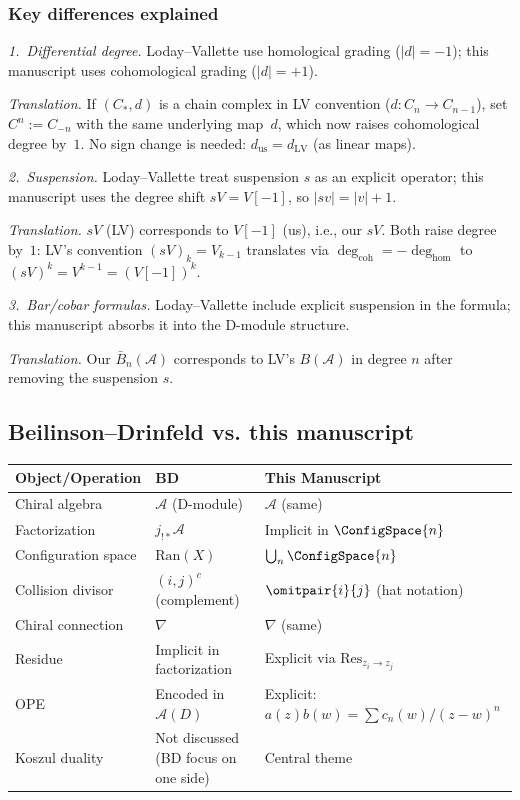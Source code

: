 \subsubsection{Key differences explained}

\emph{1.~Differential degree.}
Loday--Vallette use homological grading ($|d| = -1$); this manuscript uses cohomological grading ($|d| = +1$).

\emph{Translation.} If $(C_*, d)$ is a chain complex in LV convention ($d: C_n \to C_{n-1}$), set $C^n := C_{-n}$ with the same underlying map~$d$, which now raises cohomological degree by~$1$. No sign change is needed: $d_{\text{us}} = d_{\text{LV}}$ (as linear maps).

\emph{2.~Suspension.}
Loday--Vallette treat suspension $s$ as an explicit operator; this manuscript uses the degree shift $sV = V[-1]$, so $|sv| = |v| + 1$.

\emph{Translation.} $sV$ (LV) corresponds to $V[-1]$ (us), i.e., our $sV$. Both raise degree by~$1$: LV's convention $(sV)_k = V_{k-1}$ translates via $\deg_{\mathrm{coh}} = -\deg_{\mathrm{hom}}$ to $(sV)^k = V^{k-1} = (V[-1])^k$.

\emph{3.~Bar/cobar formulas.}
Loday--Vallette include explicit suspension in the formula; this manuscript absorbs it into the D-module structure.

\emph{Translation.} Our $\bar{B}_n(\mathcal{A})$ corresponds to LV's $B(\mathcal{A})$ in degree $n$ after removing the suspension $s$.

\subsection{Beilinson--Drinfeld vs. this manuscript}

\begin{center}
\begin{tabular}{|>{\raggedright\arraybackslash}p{5.8cm}|>{\raggedright\arraybackslash}p{3.9cm}|>{\raggedright\arraybackslash}p{3.9cm}|}
\hline
\textbf{Object/Operation} & \textbf{BD \cite{BD04}} & \textbf{This Manuscript} \\
\hline
Chiral algebra & $\mathcal{A}$ (D-module) & $\mathcal{A}$ (same) \\
Factorization & $j_{!*}\mathcal{A}$ & Implicit in $\ConfigSpace{n}$ \\
Configuration space & $\text{Ran}(X)$ & $\bigcup_n \ConfigSpace{n}$ \\
Collision divisor & $(i,j)^c$ (complement) & $\omitpair{i}{j}$ (hat notation) \\
Chiral connection & $\nabla$ & $\nabla$ (same) \\
Residue & Implicit in factorization & Explicit via $\text{Res}_{z_i \to z_j}$ \\
OPE & Encoded in $\mathcal{A}(D)$ & Explicit: $a(z)b(w) = \sum c_n(w)/(z-w)^n$ \\
Koszul duality & Not discussed (BD focus on one side) & Central theme \\
\hline
\end{tabular}
\end{center}


